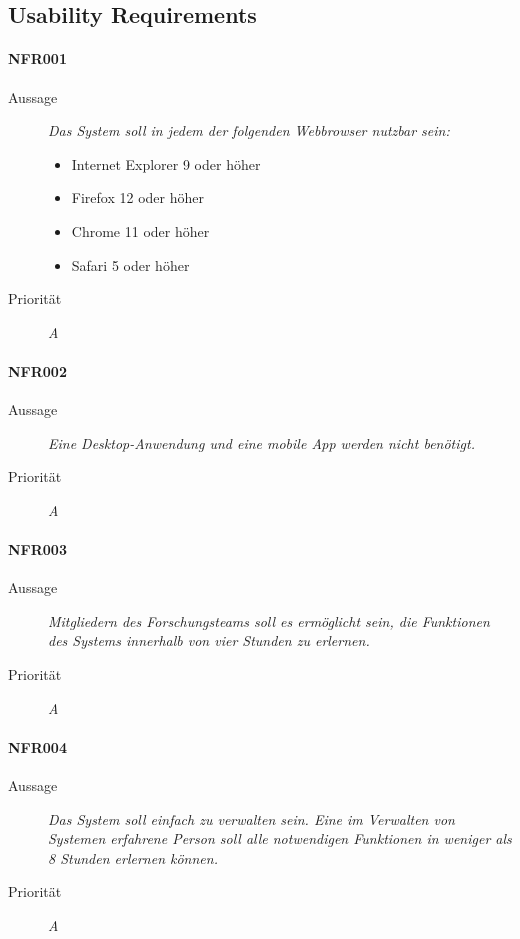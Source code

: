 \subsection{Usability Requirements}

\paragraph{NFR001}
\begin{description}
    \item[Aussage]
        \textit{Das System soll in jedem der folgenden Webbrowser nutzbar sein:}
	   \begin{itemize}
	      \item Internet Explorer 9 oder h\"oher
	      \item Firefox 12 oder h\"oher
	      \item Chrome 11 oder h\"oher
	      \item Safari 5 oder h\"oher
   	   \end{itemize}
    \item [Priorit\"at] \textit{A}
\end{description}

\paragraph{NFR002}
\begin{description}
     \item[Aussage]
        \textit{Eine Desktop-Anwendung und eine mobile App werden nicht ben\"otigt.}
    \item [Priorit\"at] \textit{A}
\end{description}

\paragraph{NFR003}
\begin{description}
     \item[Aussage]
        \textit{Mitgliedern des Forschungsteams soll es erm\"oglicht sein, die Funktionen des Systems innerhalb von vier Stunden zu erlernen.}
    \item [Priorit\"at] \textit{A}
\end{description}

\paragraph{NFR004}
\begin{description}
     \item[Aussage]
        \textit{Das System soll einfach zu verwalten sein. Eine im Verwalten von Systemen erfahrene Person soll alle notwendigen Funktionen in weniger als 8 Stunden erlernen k\"onnen.}
    \item [Priorit\"at] \textit{A}
\end{description}